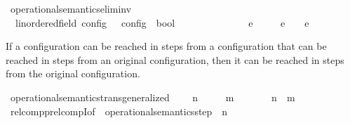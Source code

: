 \begin{isabellebody}
\isanewline
{}\isamarkupfalse%
\ operational{\isacharunderscore}semantics{\isacharunderscore}elim{\isacharunderscore}inv\isanewline
\ \ {\isacharcolon}{\isacharcolon}{\isacartoucheopen}{\isacharparenleft}{\isacharprime}{\isasymtau}{\isacharcolon}{\isacharcolon}linordered{\isacharunderscore}field{\isacharparenright}\ config\ {\isasymRightarrow}\ {\isacharprime}{\isasymtau}\ config\ {\isasymRightarrow}\ bool{\isacartoucheclose}\ \ \ \ \ \ \ \ \ \ \ \ \ \ {\isacharparenleft}{\isacartoucheopen}{\isacharunderscore}\ {\isasymhookrightarrow}\isactrlsub e\isactrlsup {\isasymleftarrow}\ {\isacharunderscore}{\isacartoucheclose}\ {}{}{\isacharparenright}\isanewline
{}\isanewline
\ \ {\isacartoucheopen}{\isasymC}\ {\isasymhookrightarrow}\isactrlsub e\isactrlsup {\isasymleftarrow}\ {\isasymC}\ {\isasymequiv}\ {\isasymC}\ {\isasymhookrightarrow}\isactrlsub e\ {\isasymC}%
\isadelimdocument
%
\endisadelimdocument
%
\isatagdocument
%
\isamarkuptrue%
%
\endisatagdocument
{\isafolddocument}%
%
\isadelimdocument
%
\endisadelimdocument
%
\begin{isamarkuptext}%
If a configuration can be reached in  steps from a configuration that 
  can be reached in  steps from an original configuration, then it can be 
  reached in  steps from the original configuration.%
\end{isamarkuptext}\isamarkuptrue%
\isamarkupfalse%
\ operational{\isacharunderscore}semantics{\isacharunderscore}trans{\isacharunderscore}generalized{\isacharcolon}\isanewline
\ \ \ {\isacartoucheopen}{\isasymC}\ {\isasymhookrightarrow}\isactrlbsup n\isactrlesup \ {\isasymC}\isanewline
\ \ \ {\isacartoucheopen}{\isasymC}\ {\isasymhookrightarrow}\isactrlbsup m\isactrlesup \ {\isasymC}\isanewline
\ \ \ \ \ {\isacartoucheopen}{\isasymC}\ {\isasymhookrightarrow}\isactrlbsup n\ {\isacharplus}\ m\isactrlesup \ {\isasymC}\isanewline
%
\isadelimproof
%
\endisadelimproof
%
\isatagproof
{}\isamarkupfalse%
\ relcompp{\isachardot}relcompI{\isacharbrackleft}of\ \ {\isacartoucheopen}operational{\isacharunderscore}semantics{\isacharunderscore}step\ {\isacharcircum}{\isacharcircum}\ n{\isacartoucheclose}\ {\isacharunderscore}\ {\isacharunderscore}\ \isanewline

\end{isabellebody}
